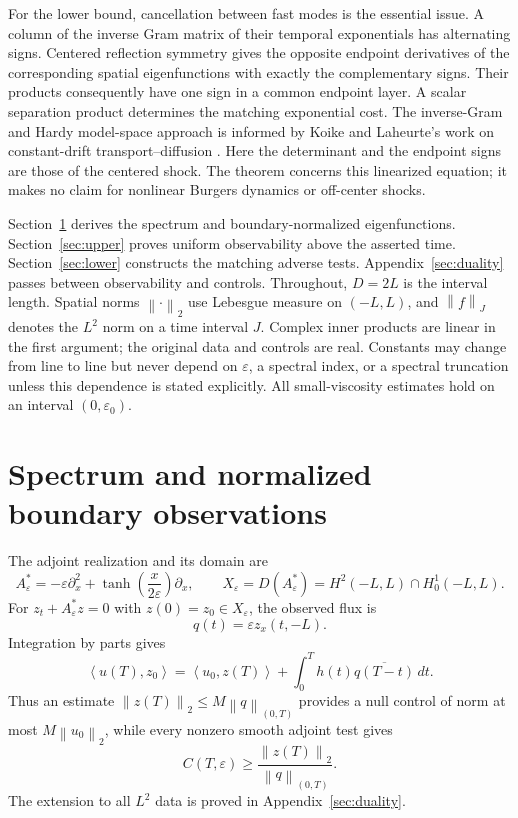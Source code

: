 \documentclass[11pt]{article}
\numberwithin{equation}{section}
\newcommand{\eps}{\varepsilon}
\newcommand{\norm}[1]{\left\|#1\right\|}
\newcommand{\ip}[2]{\left\langle #1,#2\right\rangle}
\begin{document}
For the lower bound, cancellation between fast modes is the essential
issue. A column of the inverse Gram matrix of their temporal exponentials
has alternating signs. Centered reflection symmetry gives the opposite
endpoint derivatives of the corresponding spatial eigenfunctions with
exactly the complementary signs. Their products consequently have one
sign in a common endpoint layer. A scalar separation product determines
the matching exponential cost.
The inverse-Gram and Hardy model-space approach is informed by
Koike and Laheurte's work on constant-drift transport--diffusion
\cite[Sections 3, 5 and 6.1]{KoikeLaheurte}.
Here the determinant and the endpoint signs are those of the centered
shock. The theorem concerns this linearized equation; it makes no claim
for nonlinear Burgers dynamics or off-center shocks.

Section~\ref{sec:spectral} derives the spectrum and boundary-normalized
eigenfunctions. Section~\ref{sec:upper} proves uniform observability above
the asserted time. Section~\ref{sec:lower} constructs the matching adverse
tests. Appendix~\ref{sec:duality} passes between observability and controls.
Throughout, $D=2L$ is the interval length. Spatial norms $\norm{\cdot}_2$
use Lebesgue measure on $(-L,L)$, and $\norm f_J$ denotes the $L^2$
norm on a time interval $J$. Complex inner products are linear in the
first argument; the original data and controls are real. Constants may
change from line to line but never depend on $\eps$, a spectral index,
or a spectral truncation unless this dependence is stated explicitly.
All small-viscosity estimates hold on an interval $(0,\eps_0)$.

\section{Spectrum and normalized boundary observations}\label{sec:spectral}

The adjoint realization and its domain are
\begin{equation}\label{eq:adjoint}
 A_\eps^*=-\eps\partial_x^2+
          \tanh\!\left(\frac{x}{2\eps}\right)\partial_x,\qquad
 X_\eps=D(A_\eps^*)=H^2(-L,L)\cap H_0^1(-L,L).
\end{equation}
For $z_t+A_\eps^*z=0$ with $z(0)=z_0\in X_\eps$, the observed flux is
\begin{equation}\label{eq:flux}
 q(t)=\eps z_x(t,-L).
\end{equation}
Integration by parts gives
\begin{equation}\label{eq:duality}
 \ip{u(T)}{z_0}
  =\ip{u_0}{z(T)}+\int_0^T h(t)\overline{q(T-t)}\,dt.
\end{equation}
Thus an estimate $\norm{z(T)}_2\le M\norm q_{(0,T)}$ provides a null
control of norm at most $M\norm{u_0}_2$, while every nonzero smooth
adjoint test gives
\begin{equation}\label{eq:ratio}
 C(T,\eps)\ge\frac{\norm{z(T)}_2}{\norm q_{(0,T)}}.
\end{equation}
The extension to all $L^2$ data is proved in Appendix~\ref{sec:duality}.
\end{document}
